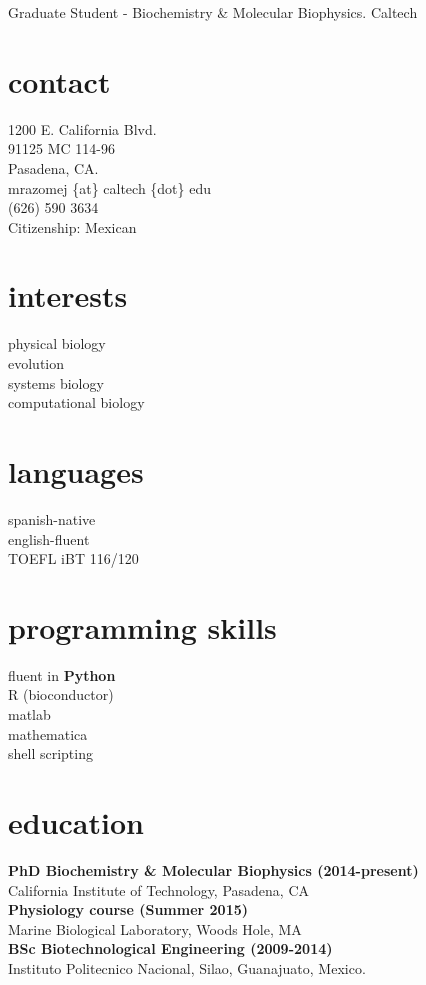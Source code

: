 \documentclass[]{friggeri-cv}
\begin{document}
       {\hspace{40 mm}Graduate Student - Biochemistry \& Molecular Biophysics. Caltech}


\begin{aside}
	\section{contact}
		1200 E. California Blvd.\\
		91125 MC 114-96\\
		Pasadena, CA.\\
  		mrazomej \{at\} caltech \{dot\} edu\\
  		(626) 590 3634\\
		Citizenship: Mexican\\
	
	\section{interests}
	physical biology\\
	evolution\\
	systems biology\\
	computational biology\\
	
	\section{languages}
		spanish-native\\
		english-fluent\\ 
		TOEFL iBT 116/120
    
    	\section{programming skills}
		fluent in \textbf{Python}\\
    		R (bioconductor)\\matlab\\mathematica\\shell scripting
\end{aside}


\section{education}
	\textbf{PhD Biochemistry \& Molecular Biophysics (2014-present)}\\
	California Institute of Technology, Pasadena, CA\\
	\textbf{Physiology course (Summer 2015)}\\
	Marine Biological Laboratory, Woods Hole, MA\\
    	\textbf{BSc Biotechnological Engineering (2009-2014)}\\
    	Instituto Politecnico Nacional, Silao, Guanajuato, Mexico.\\
\end{document}
